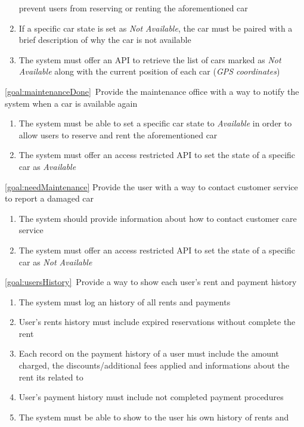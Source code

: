 \begin{description}
\begin{enumerate}[resume*]
   				prevent users from reserving or renting the aforementioned car
   				\item If a specific car state is set as \emph{Not Available}, the car must be paired
   				with a brief description of why the car is not available
   				\item The system must offer an API to retrieve the list of cars marked as \emph{Not
   				Available} along with the current position of each car (\emph{GPS coordinates})
  			\end{enumerate}
		\item \ref{goal:maintenanceDone}\ Provide the maintenance office with a way to notify the system when a car is available again
			\begin{enumerate}[resume*]
   				\item The system must be able to set a specific car state to \emph{Available} in order 
   				to allow users to reserve and rent the aforementioned car
   				\item The system must offer an access restricted API
   				to set the state of a specific car as \emph{Available}
  			\end{enumerate}
  		\item \ref{goal:needMaintenance} Provide the user with a way to contact customer service to report a damaged car
  		\begin{enumerate}[resume*]
  			\item The system should provide information about how to contact customer care
  			service
   			\item The system must offer an access restricted API to set the state of a specific car as
   			\emph{Not Available}	
  		\end{enumerate}
  		\item \ref{goal:usersHistory}\ Provide a way to show each user's rent and payment history
  			\begin{enumerate}[resume*]
  				\item The system must log an history of all rents and payments
  				\item User's rents history must include expired reservations  without complete the rent
  				\item Each record on the payment history of a user must include the amount charged,
  				the discounts/additional fees applied and informations about the rent its related to
  				\item User's payment history must include not completed payment procedures
  				\item The system must be able to show to the user his own history of rents and

\end{enumerate}
\end{description}
